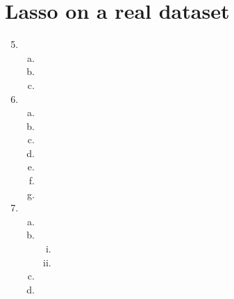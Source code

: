 \documentclass{article}
\newcommand{\1}[1]{\mathbf{1}\left\{#1\right\}}
\begin{document}
\section*{Lasso on a real dataset}
\begin{enumerate}[1.]
\setcounter{enumi}{4}
\item \begin{enumerate}[a.]
      \item
      \item
      \item
      \end{enumerate}
\item \begin{enumerate}[a.]
      \item
      \item
      \setcounter{enumii}{0}
      \item
      \item
      \item
      \item
      \item
      \end{enumerate}
\item \begin{enumerate}[a.]
      \item
      \item \begin{enumerate}[i.]
            \item
            \item
            \end{enumerate}
      \item
      \item
      \end{enumerate}
\end{enumerate}
\end{document}

